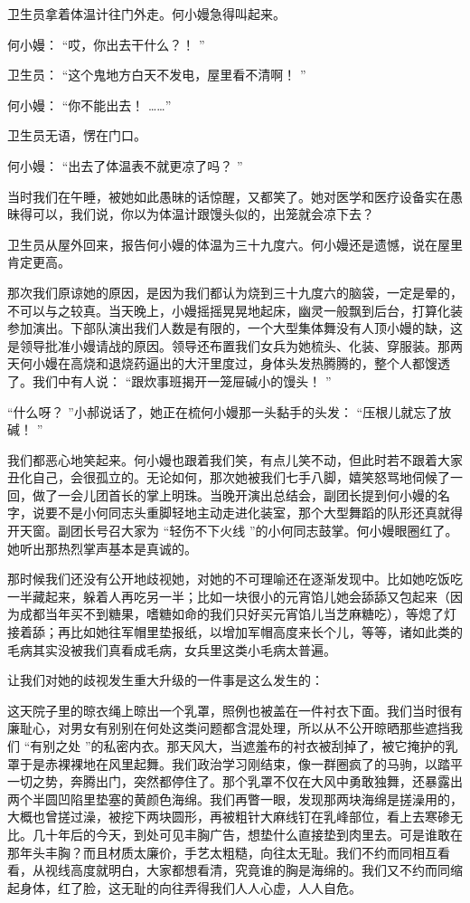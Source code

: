 \documentclass[12pt,twoside,openany]{book}
\begin{document}
卫生员拿着体温计往门外走。何小嫚急得叫起来。

何小嫚： “哎，你出去干什么？！ ”

卫生员： “这个鬼地方白天不发电，屋里看不清啊！ ”

何小嫚： “你不能出去！ ……”

卫生员无语，愣在门口。

何小嫚： “出去了体温表不就更凉了吗？ ”

当时我们在午睡，被她如此愚昧的话惊醒，又都笑了。她对医学和医疗设备实在愚昧得可以，我们说，你以为体温计跟馒头似的，出笼就会凉下去？

卫生员从屋外回来，报告何小嫚的体温为三十九度六。何小嫚还是遗憾，说在屋里肯定更高。

那次我们原谅她的原因，是因为我们都认为烧到三十九度六的脑袋，一定是晕的，不可以与之较真。当天晚上，小嫚摇摇晃晃地起床，幽灵一般飘到后台，打算化装参加演出。下部队演出我们人数是有限的，一个大型集体舞没有人顶小嫚的缺，这是领导批准小嫚请战的原因。领导还布置我们女兵为她梳头、化装、穿服装。那两天何小嫚在高烧和退烧药逼出的大汗里度过，身体头发热腾腾的，整个人都馊透了。我们中有人说： “跟炊事班揭开一笼屉碱小的馒头！ ”

“什么呀？ ”小郝说话了，她正在梳何小嫚那一头黏手的头发： “压根儿就忘了放碱！ ”

我们都恶心地笑起来。何小嫚也跟着我们笑，有点儿笑不动，但此时若不跟着大家丑化自己，会很孤立的。无论如何，那次她被我们七手八脚，嬉笑怒骂地伺候了一回，做了一会儿团首长的掌上明珠。当晚开演出总结会，副团长提到何小嫚的名字，说要不是小何同志头重脚轻地主动走进化装室，那个大型舞蹈的队形还真就得开天窗。副团长号召大家为 “轻伤不下火线 ”的小何同志鼓掌。何小嫚眼圈红了。她听出那热烈掌声基本是真诚的。

那时候我们还没有公开地歧视她，对她的不可理喻还在逐渐发现中。比如她吃饭吃一半藏起来，躲着人再吃另一半；比如一块很小的元宵馅儿她会舔舔又包起来（因为成都当年买不到糖果，嗜糖如命的我们只好买元宵馅儿当芝麻糖吃），等熄了灯接着舔；再比如她往军帽里垫报纸，以增加军帽高度来长个儿，等等，诸如此类的毛病其实没被我们真看成毛病，女兵里这类小毛病太普遍。

让我们对她的歧视发生重大升级的一件事是这么发生的：

这天院子里的晾衣绳上晾出一个乳罩，照例也被盖在一件衬衣下面。我们当时很有廉耻心，对男女有别别在何处这类问题都含混处理，所以从不公开晾晒那些遮挡我们 “有别之处 ”的私密内衣。那天风大，当遮羞布的衬衣被刮掉了，被它掩护的乳罩于是赤裸裸地在风里起舞。我们政治学习刚结束，像一群圈疯了的马驹，以踏平一切之势，奔腾出门，突然都停住了。那个乳罩不仅在大风中勇敢独舞，还暴露出两个半圆凹陷里垫塞的黄颜色海绵。我们再瞥一眼，发现那两块海绵是搓澡用的，大概也曾搓过澡，被挖下两块圆形，再被粗针大麻线钉在乳峰部位，看上去寒碜无比。几十年后的今天，到处可见丰胸广告，想垫什么直接垫到肉里去。可是谁敢在那年头丰胸？而且材质太廉价，手艺太粗糙，向往太无耻。我们不约而同相互看看，从视线高度就明白，大家都想看清，究竟谁的胸是海绵的。我们又不约而同缩起身体，红了脸，这无耻的向往弄得我们人人心虚，人人自危。
\end{document}
